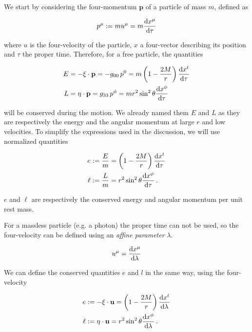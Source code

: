 We start by considering the four-momentum $\mathbf{p}$ of a particle of mass
$m$, defined as

\begin{equation}
    p^\mu := m u^\mu = m \dv{x^\mu}{\tau}
\end{equation}

where $u$ is the four-velocity of the particle, $x$ a four-vector describing its
position and $\tau$ the
proper time.
Therefore, for a free particle, the quantities

\begin{align*}
    E &= - \mathbf{\xi \cdot p} =
    - g_{00} \, p^0 = m \left( 1 - \frac{2M}{r} \right) \dv{x^t}{\tau} \\
    L &= \mathbf{\eta \cdot p} =
    g_{33} \, p^\phi = m r^2 \sin^2 \theta \dv{x^\phi}{\tau}
\end{align*}

will be conserved during the motion.
We already named them $E$ and $L$ as they are respectively the energy and the
angular momentum at large $r$ and low velocities.
To simplify the expressions used in the discussion, we will use normalized
quantities

\begin{subequations}
    \begin{align}
        e &:= \frac{E}{m} = \left( 1 - \frac{2M}{r} \right) \dv{x^t}{\tau}
        \label{cap1:eq:conserved_e} \\
        \ell &:= \frac{L}{m} = r^2 \sin^2 \theta \dv{x^\phi}{\tau} \, .
        \label{cap1:eq:conserved_l}
    \end{align}
\end{subequations}

$e$ and $\ell$ are respectively the conserved energy and angular momentum per
unit
rest mass.

For a massless particle (e.g. a photon) the proper time can not be used, so
the four-velocity can be defined using an \textit{affine parameter} $\lambda$.

\begin{equation}
    u^\mu = \dv{x^\mu}{\lambda}
    \label{cap1:eq:u_light}
\end{equation}

We can define the conserved quantities $e$ and $l$ in the same way, using the
four-velocity

\begin{subequations}
    \begin{align}
        e &:= - \xi \cdot \mathbf{u}
        = \left( 1 - \frac{2M}{r} \right) \dv{x^t}{\lambda} \\
        \ell &:= \eta \cdot \mathbf{u} 
        = r^2 \sin^2 \theta \dv{x^\phi}{\lambda} \, .
        \label{cap1:eq:e_light}
    \end{align}
    \label{cap1:eq:conserved_light}    
\end{subequations}

